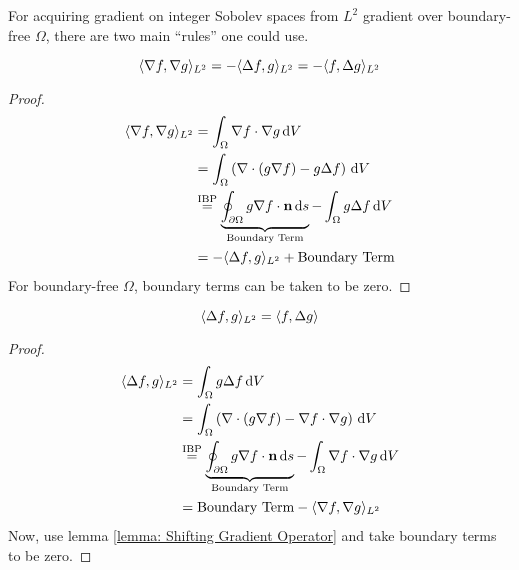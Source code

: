 \documentclass[../dissertation.tex]{subfiles}
\begin{document}
For acquiring gradient on integer Sobolev spaces from $L^2$ gradient over boundary-free $\Omega$,
there are two main ``rules'' one could use.

\begin{lemma}
    \label{lemma: Shifting Gradient Operator}
    \begin{equation}
        \langle \nabla f,\nabla g \rangle_{L^2} = -\langle \Delta f, g \rangle_{L^2} = -\langle f, \Delta g \rangle_{L^2}
    \end{equation}
    \begin{proof}
        \begin{align*}
            \langle \nabla f, \nabla g \rangle_{L^2} &= \int_{\Omega} \nabla f \cdot \nabla g \, \text{d} V \\
            &= \int_{\Omega} \left( \nabla \cdot \left( g \nabla f \right) - g \Delta f \right) \, \text{d} V \\
            &\stackrel{\text{IBP}}{=} \underbrace{\oint_{\partial \Omega} g \nabla f \cdot \mathbf{n} \, \text{d} s}_{\text{Boundary Term}} - \int_{\Omega} g \Delta f \, \text{d} V\\
            &= -\langle \Delta f, g \rangle_{L^2} + \text{Boundary Term}
        \end{align*}
        For boundary-free $\Omega$, boundary terms can be taken to be zero.
    \end{proof}
\end{lemma}

\begin{lemma}
    \label{lemma: Shifting Laplacian Operator}
    \begin{equation}
        \langle \Delta f, g \rangle_{L^2} = \langle f, \Delta g \rangle
    \end{equation}
    \begin{proof}
        \begin{align*}
            \langle \Delta f, g \rangle_{L^2} &= \int_{\Omega} g \Delta f \, \text{d} V \\
            &= \int_{\Omega} \left( \nabla \cdot \left( g \nabla f \right) - \nabla f \cdot \nabla g \right) \, \text{d} V \\
            &\stackrel{\text{IBP}}{=} \underbrace{\oint_{\partial \Omega} g \nabla f \cdot \mathbf{n} \, \text{d} s}_{\text{Boundary Term}} - \int_{\Omega} \nabla f \cdot \nabla g \, \text{d} V \\
            &= \text{Boundary Term} - \langle \nabla f, \nabla g \rangle_{L^2}
        \end{align*}
        Now, use lemma \ref{lemma: Shifting Gradient Operator} and take boundary terms to be zero.
    \end{proof}
\end{lemma}
\end{document}

